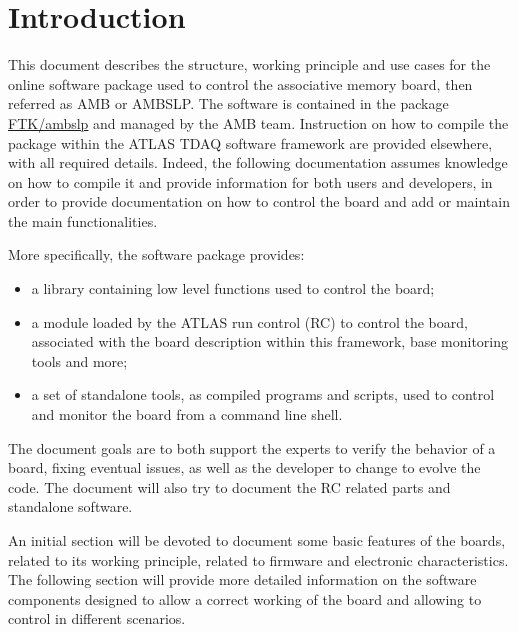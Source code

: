 \documentclass[UKenglish]{latex/atlasdoc}
\begin{document}
	
\maketitle

\tableofcontents

\section{Introduction}
This document describes  the structure, working principle and use cases for
the online software package used to
control the associative memory board, then referred as AMB or AMBSLP.
The software is contained in the package
\hyperlink{https://svnweb.cern.ch/trac/atlastdaq/browser/FTK/ambslp?order=name}
	{FTK/ambslp}
and managed by the AMB team. Instruction on how to compile the
package within the ATLAS TDAQ software framework are provided elsewhere,
with all required details. Indeed, the following documentation assumes knowledge
on how to compile it and provide information for both users and developers,
in order to provide documentation on how to control the board and
add or maintain the main functionalities.

More specifically,
the software  package provides:
\begin{itemize}
  \item a library containing low level functions
  used to control the board;

	\item a module loaded by the ATLAS run control (RC) to control the board,
	associated with the board description within this framework, base monitoring
    tools and more;
    
	\item a set of standalone tools, as compiled programs and scripts,
	used to control and monitor the board from a command line shell.
\end{itemize} 

The document goals are to both support the experts to verify
the behavior of a board, fixing eventual issues, as well as the developer to
change to evolve the code. The document will also try to document
the RC related parts and standalone software.

An initial section will be devoted to document some basic features of the boards,
related to its working principle, related to firmware and electronic characteristics.
The following section will provide more detailed information on the software components
designed to allow a correct working of the board and allowing to control
in different scenarios.
\end{document}
